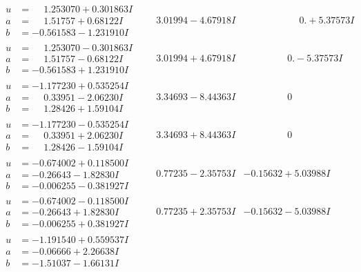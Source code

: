 \documentclass[1p]{elsarticle_modified}
\theoremstyle{definition}
\begin{document}
$$\begin{array}{c|c|c}
\begin{aligned}
u &= \phantom{-}1.253070 + 0.301863 I \\
a &= \phantom{-}1.51757 + 0.68122 I \\
b &= -0.561583 - 1.231910 I\end{aligned}
 & \phantom{-}3.01994 - 4.67918 I & \phantom{-0.000000 -}0. + 5.37573 I \\ \hline\begin{aligned}
u &= \phantom{-}1.253070 - 0.301863 I \\
a &= \phantom{-}1.51757 - 0.68122 I \\
b &= -0.561583 + 1.231910 I\end{aligned}
 & \phantom{-}3.01994 + 4.67918 I & \phantom{-0.000000 } 0. - 5.37573 I \\ \hline\begin{aligned}
u &= -1.177230 + 0.535254 I \\
a &= \phantom{-}0.33951 - 2.06230 I \\
b &= \phantom{-}1.28426 + 1.59104 I\end{aligned}
 & \phantom{-}3.34693 - 8.44363 I & \phantom{-0.000000 } 0 \\ \hline\begin{aligned}
u &= -1.177230 - 0.535254 I \\
a &= \phantom{-}0.33951 + 2.06230 I \\
b &= \phantom{-}1.28426 - 1.59104 I\end{aligned}
 & \phantom{-}3.34693 + 8.44363 I & \phantom{-0.000000 } 0 \\ \hline\begin{aligned}
u &= -0.674002 + 0.118500 I \\
a &= -0.26643 - 1.82830 I \\
b &= -0.006255 - 0.381927 I\end{aligned}
 & \phantom{-}0.77235 - 2.35753 I & -0.15632 + 5.03988 I \\ \hline\begin{aligned}
u &= -0.674002 - 0.118500 I \\
a &= -0.26643 + 1.82830 I \\
b &= -0.006255 + 0.381927 I\end{aligned}
 & \phantom{-}0.77235 + 2.35753 I & -0.15632 - 5.03988 I \\ \hline\begin{aligned}
u &= -1.191540 + 0.559537 I \\
a &= -0.06666 + 2.26638 I \\
b &= -1.51037 - 1.66131 I\end{aligned}

\end{array}$$
\end{document}
